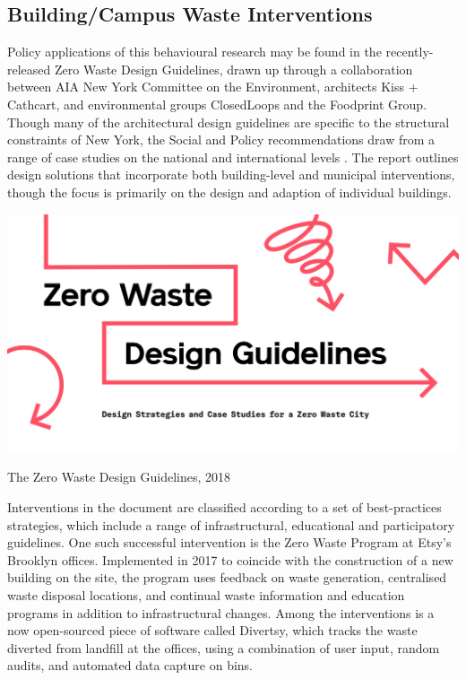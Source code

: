 \documentclass[nofonts,nols,justified,nobib]{tufte-book}
\begin{document}

\subsection*{Building/Campus Waste Interventions}
Policy applications of this behavioural research may be found in the recently-released Zero Waste Design Guidelines, drawn up through a collaboration between AIA New York Committee on the Environment, architects Kiss + Cathcart, and environmental groups ClosedLoops and the Foodprint Group. Though many of the architectural design guidelines are specific to the structural constraints of New York, the Social and Policy recommendations draw from a range of case studies on the national and international levels \cite{aia_new_york_zero_2017}. The report outlines design solutions that incorporate both building-level and municipal interventions, though the focus is primarily on the design and adaption of individual buildings.

\begin{marginfigure}
\includegraphics[width=\textwidth]{img/1/zero-waste-guidelines.png}
\caption{The Zero Waste Design Guidelines, 2018 \cite{aia_new_york_zero_2017}}
\end{marginfigure}

Interventions in the document are classified according to a set of best-practices strategies, which include a range of infrastructural, educational and participatory guidelines. One such successful intervention is the Zero Waste Program at Etsy's Brooklyn offices. Implemented in 2017 to coincide with the construction of a new building on the site, the program uses feedback on waste generation, centralised waste disposal locations, and continual waste information and education programs in addition to infrastructural changes. Among the interventions is a now open-sourced piece of software called Divertsy, which tracks the waste diverted from landfill at the offices, using a combination of user input, random audits, and automated data capture on bins.
\end{document}
